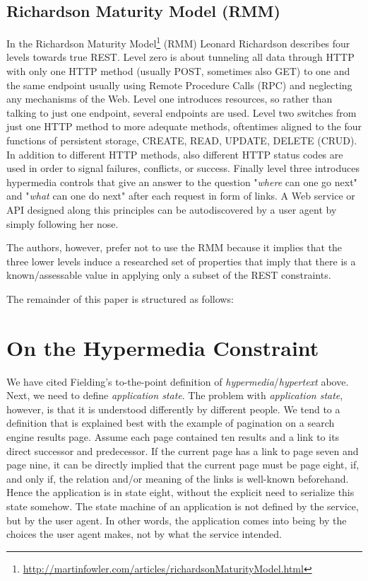 \documentclass{acm_proc_article-sp}
\begin{document}
\subsection{Richardson Maturity Model (RMM)}\label{sec:rmm}
In the Richardson Maturity Model\footnote{\url{http://martinfowler.com/articles/richardsonMaturityModel.html}} (RMM) Leonard Richardson describes four levels towards true REST. Level zero is about tunneling all data through HTTP with only one HTTP method (usually POST, sometimes also GET) to one and the same endpoint usually using Remote Procedure Calls (RPC) and neglecting any mechanisms of the Web. Level one introduces resources, so rather than talking to just one endpoint, several endpoints are used. Level two switches from just one HTTP method to more adequate methods, oftentimes aligned to the four functions of persistent storage, CREATE, READ, UPDATE, DELETE (CRUD). In addition to different HTTP methods, also different HTTP status codes are used in order to signal failures, conflicts, or success. Finally level three introduces hypermedia controls that give an answer to the question "\textit{where} can one go next" and "\textit{what} can one do next" after each request in form of links. A Web service or API designed along this principles can be autodiscovered by a user agent by simply following her nose.

The authors, however, prefer not to use the RMM because it implies that the three lower levels induce a researched set of properties that imply that there is a known/assessable value in applying only a subset of the REST constraints.

The remainder of this paper is structured as follows: 

\section{On the Hypermedia Constraint}\label{sec:hateoas}
We have cited Fielding's to-the-point definition of \textit{hypermedia}/\textit{hypertext} above. Next, we need to define \textit{application state}. The problem with \textit{application state}, however, is that it is understood differently by different people. We tend to a definition that is explained best with the example of pagination on a search engine results page. Assume each page contained ten results and a link to its direct successor and predecessor. If the current page has a link to page seven and page nine, it can be directly implied that the current page must be page eight, if, and only if, the relation and/or meaning of the links is well-known beforehand. Hence the application is in state eight, without the explicit need to serialize this state somehow. The state machine of an application is not defined by the service, but by the user agent. In other words, the application comes into being by the choices the user agent makes, not by what the service intended.
\end{document}
